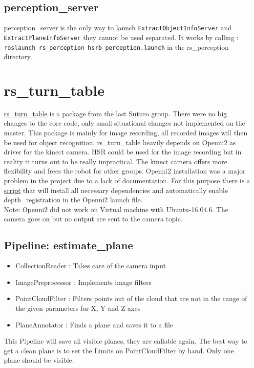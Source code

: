 \documentclass[main.tex]{subfiles}
\begin{document}
			\subsection{perception\_server}
perception\_server is the only way to launch \texttt{ExtractObjectInfoServer} and \texttt{ExtractPlaneInfoServer} they cannot be used separated. 
It works by calling :\texttt{ roslaunch rs\_perception hsrb\_perception.launch} in the rs\_perception directory.

		\section{rs\_turn\_table}
\href{https://github.com/Vanessa-rin/rs_turn_table}{rs\_turn\_table} is a package from the last Suturo group. There were no big changes to the core code, only small situational changes not implemented on the master. 
This package is mainly for image recording, all recorded images will then be used for object recognition.  
rs\_turn\_table heavily depends on Openni2 as driver for the kinect camera. HSR could be used for the image recording but in reality it turns out to be really impractical. 
The kinect camera offers more flexibility and frees the robot for other groups. Openni2 installation was a major problem in the project due to a lack of documentation. For this purpose there is a 
\href{https://github.com/SUTURO/suturo_perception/blob/Openni2/Openni2/Openni2_Install}{script} that will install all necessary dependencies and automatically enable depth\_registration in the Openni2 launch file. \\ Note: Openni2 did not work on Virtual machine with Ubuntu-16.04.6. The camera goes on but no output are sent to the camera topic. 

			\subsection{Pipeline: estimate\_plane}
\begin{itemize}
	\item CollectionReader : Takes care of the camera input
	\item ImagePreprocessor : Implements image filters  
	\item PointCloudFilter : Filters points out of the cloud that are not in the range of the given parameters for X, Y and Z axes
	\item PlaneAnnotator : Finds a plane and saves it to a file 
\end{itemize}
This Pipeline will save all visible planes, they are callable again. The best way to get a clean plane is to set the Limits on PointCloudFilter by hand. Only one plane should be visible. 
\end{document}
